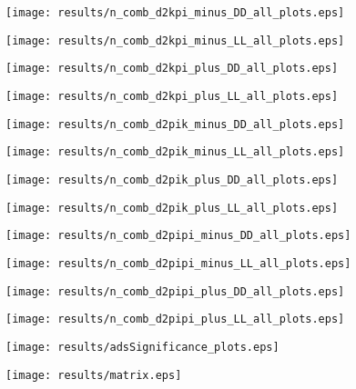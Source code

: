 \documentclass[11pt,a4paper]{article}
\begin{document}
\texttt{[image: results/n\_comb\_d2kpi\_minus\_DD\_all\_plots.eps]}

\texttt{[image: results/n\_comb\_d2kpi\_minus\_LL\_all\_plots.eps]}

\texttt{[image: results/n\_comb\_d2kpi\_plus\_DD\_all\_plots.eps]}

\texttt{[image: results/n\_comb\_d2kpi\_plus\_LL\_all\_plots.eps]}

\texttt{[image: results/n\_comb\_d2pik\_minus\_DD\_all\_plots.eps]}

\texttt{[image: results/n\_comb\_d2pik\_minus\_LL\_all\_plots.eps]}

\texttt{[image: results/n\_comb\_d2pik\_plus\_DD\_all\_plots.eps]}

\texttt{[image: results/n\_comb\_d2pik\_plus\_LL\_all\_plots.eps]}

\texttt{[image: results/n\_comb\_d2pipi\_minus\_DD\_all\_plots.eps]}

\texttt{[image: results/n\_comb\_d2pipi\_minus\_LL\_all\_plots.eps]}

\texttt{[image: results/n\_comb\_d2pipi\_plus\_DD\_all\_plots.eps]}

\texttt{[image: results/n\_comb\_d2pipi\_plus\_LL\_all\_plots.eps]}
\fi

\texttt{[image: results/adsSignificance\_plots.eps]}


\clearpage
\texttt{[image: results/matrix.eps]}
\end{document}
